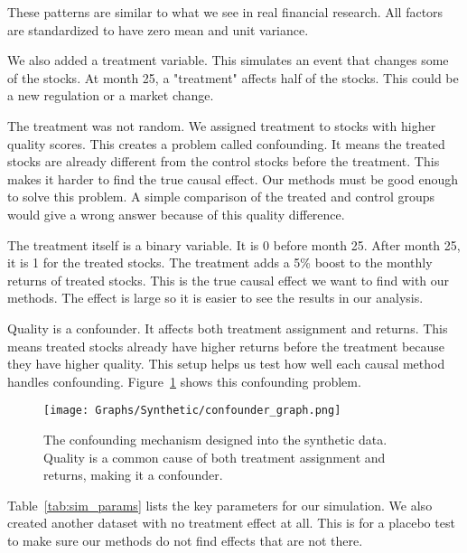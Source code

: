These patterns are similar to what we see in real financial research. All factors are standardized to have zero mean and unit variance.

We also added a treatment variable. This simulates an event that changes some of the stocks. At month 25, a "treatment" affects half of the stocks. This could be a new regulation or a market change.

The treatment was not random. We assigned treatment to stocks with higher quality scores. This creates a problem called confounding. It means the treated stocks are already different from the control stocks before the treatment. This makes it harder to find the true causal effect. Our methods must be good enough to solve this problem. A simple comparison of the treated and control groups would give a wrong answer because of this quality difference.

The treatment itself is a binary variable. It is 0 before month 25. After month 25, it is 1 for the treated stocks. The treatment adds a 5\% boost to the monthly returns of treated stocks. This is the true causal effect we want to find with our methods. The effect is large so it is easier to see the results in our analysis.

Quality is a confounder. It affects both treatment assignment and returns. This means treated stocks already have higher returns before the treatment because they have higher quality. This setup helps us test how well each causal method handles confounding. Figure~\ref{fig:confounder} shows this confounding problem.

\begin{figure}[ht]
\centering
\texttt{[image: Graphs/Synthetic/confounder\_graph.png]}
\caption{The confounding mechanism designed into the synthetic data. Quality is a common cause of both treatment assignment and returns, making it a confounder.}
\label{fig:confounder}
\end{figure}

Table~\ref{tab:sim_params} lists the key parameters for our simulation. We also created another dataset with no treatment effect at all. This is for a placebo test to make sure our methods do not find effects that are not there.

